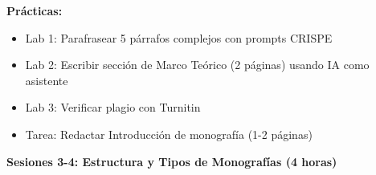 \documentclass[12pt,a4paper]{yaac-luatex}
\newcommand{\subsecciontitulo}[1]{
	{\color{maincolor}\large\bfseries #1}
}
\begin{document}
\begin{tcolorbox}[
		enhanced,
		colback=white,
		colframe=curso3color,
		arc=3pt,
		boxrule=1.5pt,
		left=10pt,
		right=10pt,
		top=8pt,
		bottom=8pt,
		breakable
		]
		\textbf{Prácticas:}
		\begin{itemize}[leftmargin=*, itemsep=0.1cm]
			\item Lab 1: Parafrasear 5 párrafos complejos con prompts CRISPE
			\item Lab 2: Escribir sección de Marco Teórico (2 páginas) usando IA como asistente
			\item Lab 3: Verificar plagio con Turnitin
			\item Tarea: Redactar Introducción de monografía (1-2 páginas)
		\end{itemize}
	\end{tcolorbox}
	
	\vspace{0.3cm}
	
	\begin{tcolorbox}[
		enhanced,
		colback=white,
		colframe=curso3color,
		arc=3pt,
		boxrule=1.5pt,
		left=10pt,
		right=10pt,
		top=8pt,
		bottom=8pt,
		breakable
		]
		\subsecciontitulo{Sesiones 3-4: Estructura y Tipos de Monografías (4 horas)}
		

\end{tcolorbox}
\end{document}
